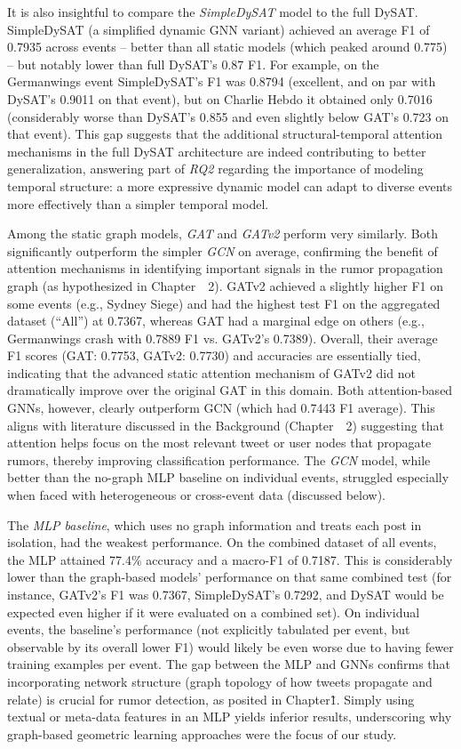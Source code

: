 \documentclass{cshonours}
\begin{document}
It is also insightful to compare the \textit{SimpleDySAT} model to the full DySAT. SimpleDySAT (a simplified dynamic GNN variant) achieved an average F1 of 0.7935 across events – better than all static models (which peaked around 0.775) – but notably lower than full DySAT’s 0.87 F1. For example, on the Germanwings event SimpleDySAT’s F1 was 0.8794 (excellent, and on par with DySAT’s 0.9011 on that event), but on Charlie Hebdo it obtained only 0.7016 (considerably worse than DySAT’s 0.855 and even slightly below GAT’s 0.723 on that event). This gap suggests that the additional structural-temporal attention mechanisms in the full DySAT architecture are indeed contributing to better generalization, answering part of \emph{RQ2} regarding the importance of modeling temporal structure: a more expressive dynamic model can adapt to diverse events more effectively than a simpler temporal model.

Among the static graph models, \emph{GAT} and \emph{GATv2} perform very similarly. Both significantly outperform the simpler \emph{GCN} on average, confirming the benefit of attention mechanisms in identifying important signals in the rumor propagation graph (as hypothesized in Chapter~~2). GATv2 achieved a slightly higher F1 on some events (e.g., Sydney Siege) and had the highest test F1 on the aggregated dataset (“All”) at 0.7367, whereas GAT had a marginal edge on others (e.g., Germanwings crash with 0.7889 F1 vs. GATv2’s 0.7389). Overall, their average F1 scores (GAT: 0.7753, GATv2: 0.7730) and accuracies are essentially tied, indicating that the advanced static attention mechanism of GATv2 did not dramatically improve over the original GAT in this domain. Both attention-based GNNs, however, clearly outperform GCN (which had 0.7443 F1 average). This aligns with literature discussed in the Background (Chapter~~2) suggesting that attention helps focus on the most relevant tweet or user nodes that propagate rumors, thereby improving classification performance. The \emph{GCN} model, while better than the no-graph MLP baseline on individual events, struggled especially when faced with heterogeneous or cross-event data (discussed below).

The \emph{MLP baseline}, which uses no graph information and treats each post in isolation, had the weakest performance. On the combined dataset of all events, the MLP attained 77.4\% accuracy and a macro-F1 of 0.7187. This is considerably lower than the graph-based models’ performance on that same combined test (for instance, GATv2’s F1 was 0.7367, SimpleDySAT’s 0.7292, and DySAT would be expected even higher if it were evaluated on a combined set). On individual events, the baseline’s performance (not explicitly tabulated per event, but observable by its overall lower F1) would likely be even worse due to having fewer training examples per event. The gap between the MLP and GNNs confirms that incorporating network structure (graph topology of how tweets propagate and relate) is crucial for rumor detection, as posited in Chapter\~1. Simply using textual or meta-data features in an MLP yields inferior results, underscoring why graph-based geometric learning approaches were the focus of our study.
\end{document}
